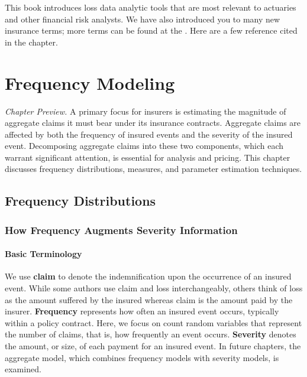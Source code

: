 \documentclass[]{book}
\theoremstyle{definition}
\theoremstyle{definition}
\theoremstyle{definition}
\theoremstyle{remark}
\begin{document}
This book introduces loss data analytic tools that are most relevant to
actuaries and other financial risk analysts. We have also introduced you
to many new insurance terms; more terms can be found at the
\citet{NAICGlossary}. Here are a few reference cited in the chapter.

\chapter{Frequency Modeling}\label{C:Frequency-Modeling}

\emph{Chapter Preview.} A primary focus for insurers is estimating the
magnitude of aggregate claims it must bear under its insurance
contracts. Aggregate claims are affected by both the frequency of
insured events and the severity of the insured event. Decomposing
aggregate claims into these two components, which each warrant
significant attention, is essential for analysis and pricing. This
chapter discusses frequency distributions, measures, and parameter
estimation techniques.

\section{Frequency Distributions}\label{S:frequency-distributions}

\subsection{How Frequency Augments Severity
Information}\label{S:how-frequency-augments-severity-information}

\subsubsection{Basic Terminology}\label{S:basic-terminology}

We use \textbf{claim} to denote the indemnification upon the occurrence
of an insured event. While some authors use claim and loss
interchangeably, others think of loss as the amount suffered by the
insured whereas claim is the amount paid by the insurer.
\textbf{Frequency} represents how often an insured event occurs,
typically within a policy contract. Here, we focus on count random
variables that represent the number of claims, that is, how frequently
an event occurs. \textbf{Severity} denotes the amount, or size, of each
payment for an insured event. In future chapters, the aggregate model,
which combines frequency models with severity models, is examined.
\end{document}
